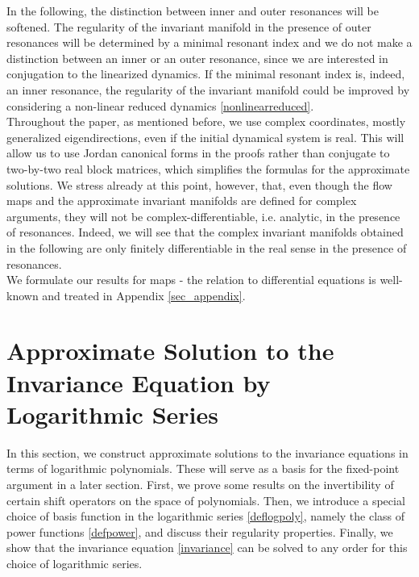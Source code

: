 \documentclass{amsart}
\theoremstyle{plain}
\theoremstyle{definition}
\begin{document}
In the following, the distinction between inner and outer resonances will be softened. The regularity of the invariant manifold in the presence of outer resonances will be determined by a minimal resonant index and we do not make a distinction between an inner or an outer resonance, since we are interested in conjugation to the linearized dynamics. If the minimal resonant index is, indeed, an inner resonance, the regularity of the invariant manifold could be improved by considering a non-linear reduced dynamics \eqref{nonlinearreduced}.\\
Throughout the paper, as mentioned before, we use complex coordinates, mostly generalized eigendirections, even if the initial dynamical system is real. This will allow us to use Jordan canonical forms in the proofs rather than conjugate to two-by-two real block matrices, which simplifies the formulas for the approximate solutions. We stress already at this point, however, that, even though the flow maps and the approximate invariant manifolds are defined for complex arguments, they will not be complex-differentiable, i.e. analytic,  in the presence of resonances. Indeed, we will see that the complex invariant manifolds obtained in the following are only finitely differentiable in the real sense in the presence of resonances.\\
We formulate our results for maps - the relation to differential equations is well-known and treated in Appendix \ref{sec_appendix}.





\section{Approximate Solution to the Invariance Equation by Logarithmic Series}\label{approxsol}

In this section, we construct approximate solutions to the invariance equations in terms of logarithmic polynomials. These will serve as a basis for the fixed-point argument in a later section. First, we prove some results on the invertibility of certain shift operators on the space of polynomials. Then, we introduce a special choice of basis function in the logarithmic series \eqref{deflogpoly}, namely the class of power functions \eqref{defpower}, and discuss their regularity properties. Finally, we show that the invariance equation \eqref{invariance} can be solved to any order for this choice of logarithmic series.\\
\end{document}
